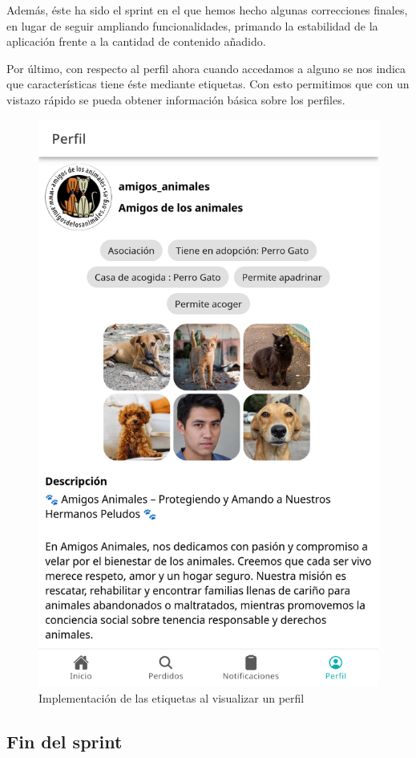 Además, éste ha sido el sprint en el que hemos hecho algunas correcciones finales, en lugar de seguir ampliando funcionalidades, primando la estabilidad de la aplicación frente a la cantidad de contenido añadido.

Por último, con respecto al perfil ahora cuando accedamos a alguno se nos indica que características tiene éste mediante etiquetas. Con esto permitimos que con un vistazo rápido se pueda obtener información básica sobre los perfiles.

\begin{figure}[H]
	\centering
	\includegraphics[width=0.5\linewidth]{"sprint 4/etiquetasPerfil"}
	\caption{Implementación de las etiquetas al  visualizar un perfil}
	\label{fig:etiquetasperfil}
\end{figure}

\subsection{Fin del sprint}

